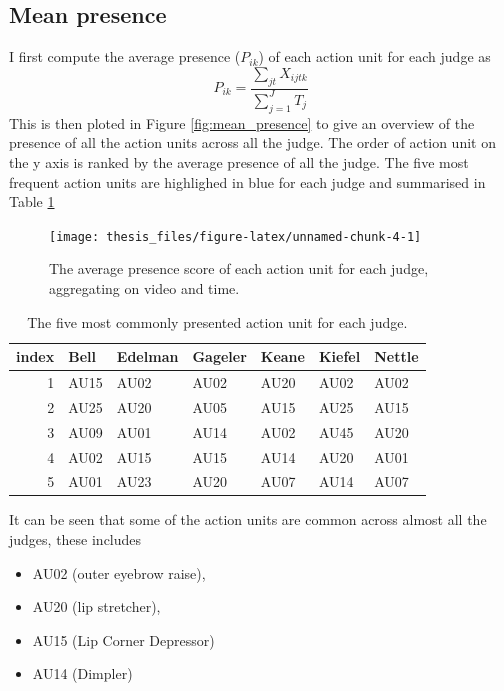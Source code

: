\documentclass{monashthesis}
\begin{document}
\hypertarget{mean-presence}{%
\subsection{Mean presence}\label{mean-presence}}

I first compute the average presence (\(P_{ik}\)) of each action unit for each judge as \[P_{ik} = \frac{\sum_{jt}X_{ijtk}}{\sum_{j = 1}^JT_j}\] This is then ploted in Figure \ref{fig:mean_presence} to give an overview of the presence of all the action units across all the judge. The order of action unit on the y axis is ranked by the average presence of all the judge. The five most frequent action units are highlighed in blue for each judge and summarised in Table \ref{tab:most_common}

\begin{figure}
\texttt{[image: thesis\_files/figure-latex/unnamed-chunk-4-1]} \caption{The average presence score of each action unit for each judge, aggregating on video and time. \label{fig:mean_presence}}\label{fig:unnamed-chunk-4}
\end{figure}

\begin{table}[t]

\caption{\label{tab:unnamed-chunk-5}\label{tab:most_common}The five most commonly presented action unit for each judge.}
\centering
\begin{tabular}{r|l|l|l|l|l|l}
\hline
index & Bell & Edelman & Gageler & Keane & Kiefel & Nettle\\
\hline
1 & AU15 & AU02 & AU02 & AU20 & AU02 & AU02\\
\hline
2 & AU25 & AU20 & AU05 & AU15 & AU25 & AU15\\
\hline
3 & AU09 & AU01 & AU14 & AU02 & AU45 & AU20\\
\hline
4 & AU02 & AU15 & AU15 & AU14 & AU20 & AU01\\
\hline
5 & AU01 & AU23 & AU20 & AU07 & AU14 & AU07\\
\hline
\end{tabular}
\end{table}

It can be seen that some of the action units are common across almost all the judges, these includes

\begin{itemize}
\tightlist
\item
  AU02 (outer eyebrow raise),
\item
  AU20 (lip stretcher),
\item
  AU15 (Lip Corner Depressor)
\item
  AU14 (Dimpler)
\end{itemize}
\end{document}
